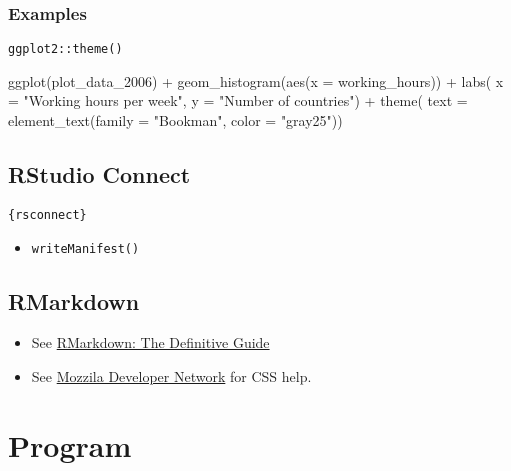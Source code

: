 \documentclass[
]{book}
\newenvironment{Shaded}{\begin{snugshade}}{\end{snugshade}}
\newcommand{\AttributeTok}[1]{\textcolor[rgb]{0.77,0.63,0.00}{#1}}
\newcommand{\FunctionTok}[1]{\textcolor[rgb]{0.00,0.00,0.00}{#1}}
\newcommand{\NormalTok}[1]{#1}
\newcommand{\SpecialCharTok}[1]{\textcolor[rgb]{0.00,0.00,0.00}{#1}}
\newcommand{\StringTok}[1]{\textcolor[rgb]{0.31,0.60,0.02}{#1}}
\providecommand{\tightlist}{%
  \setlength{\itemsep}{0pt}\setlength{\parskip}{0pt}}
\begin{document}
\hypertarget{examples-6}{%
\subsection{Examples}\label{examples-6}}

\texttt{ggplot2::theme()}

\begin{Shaded}
\begin{Highlighting}[]
\FunctionTok{ggplot}\NormalTok{(plot\_data\_2006) }\SpecialCharTok{+}
  \FunctionTok{geom\_histogram}\NormalTok{(}\FunctionTok{aes}\NormalTok{(}\AttributeTok{x =}\NormalTok{ working\_hours)) }\SpecialCharTok{+}
  \FunctionTok{labs}\NormalTok{(}
    \AttributeTok{x =} \StringTok{"Working hours per week"}\NormalTok{,}
    \AttributeTok{y =} \StringTok{"Number of countries"}\NormalTok{) }\SpecialCharTok{+}
  \FunctionTok{theme}\NormalTok{(}
    \AttributeTok{text =} \FunctionTok{element\_text}\NormalTok{(}\AttributeTok{family =} \StringTok{"Bookman"}\NormalTok{, }\AttributeTok{color =} \StringTok{"gray25"}\NormalTok{))}
\end{Highlighting}
\end{Shaded}

\hypertarget{rstudio-connect}{%
\section{RStudio Connect}\label{rstudio-connect}}

\texttt{\{rsconnect\}}

\begin{itemize}
\tightlist
\item
  \texttt{writeManifest()}
\end{itemize}

\hypertarget{rmarkdown}{%
\section{RMarkdown}\label{rmarkdown}}

\begin{itemize}
\tightlist
\item
  See \href{https://bookdown.org/yihui/rmarkdown/}{RMarkdown: The Definitive Guide}
\item
  See \href{https://developer.mozilla.org/en-US/docs/Web/CSS/CSS_Selectors}{Mozzila Developer Network} for CSS help.
\end{itemize}

\hypertarget{program}{%
\chapter{Program}\label{program}}
\end{document}
